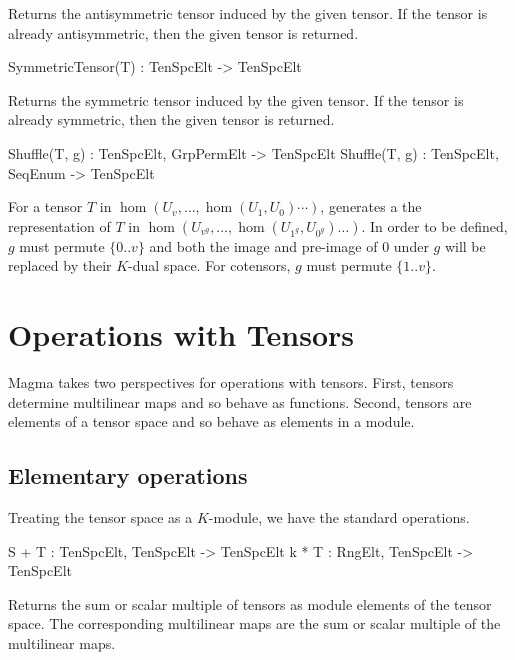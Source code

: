 Returns the antisymmetric tensor induced by the given tensor. If 
the tensor is already antisymmetric, then the given tensor is returned.

\begin{intrinsics}
SymmetricTensor(T) : TenSpcElt -> TenSpcElt
\end{intrinsics}

Returns the symmetric tensor induced by the given tensor. If the tensor is 
already symmetric, then the given tensor is returned.

\begin{intrinsics}
Shuffle(T, g) : TenSpcElt, GrpPermElt -> TenSpcElt
Shuffle(T, g) : TenSpcElt, SeqEnum -> TenSpcElt
\end{intrinsics}

For a tensor $T$ in $\hom(U_v,\dots,\hom(U_1,U_0)\cdots)$, 
generates a the representation of $T$ in $\hom(U_{v^g},\dots,\hom(U_{1^g},U_{0^g})\dots)$.
In order to be defined, $g$ must permute $\{0..v\}$ and both the image and 
pre-image of $0$ under $g$ will be replaced by their $K$-dual space.
For cotensors, $g$ must permute $\{1..v\}$.


\section{Operations with Tensors}

Magma takes two perspectives for operations with tensors. 
First, tensors determine multilinear maps and so behave as
functions.  Second, tensors are elements of a tensor space and 
so behave as elements in a module.  

\subsection{Elementary operations}
Treating the tensor space as a $K$-module, we have the standard operations.

\index{$+$}
\begin{intrinsics}
S + T : TenSpcElt, TenSpcElt -> TenSpcElt
k * T : RngElt, TenSpcElt -> TenSpcElt
\end{intrinsics}

Returns the sum or scalar multiple of tensors as module elements of the tensor 
space. The corresponding multilinear maps are the sum or scalar multiple of the 
multilinear maps.


